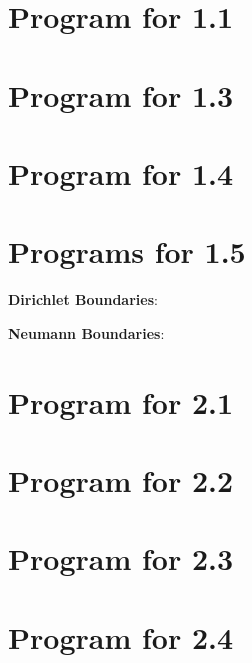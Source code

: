 \documentclass[10pt]{article}
\begin{document}
\newpage
\begin{appendix}
\section{Program for 1.1}
\label{a:1.1}

\newpage
\section{Program for 1.3}
\label{a:1.3}

\newpage
\section{Program for 1.4}
\label{a:1.4}

\newpage
\section{Programs for 1.5}
\label{a:1.5}
{\bf Dirichlet Boundaries}:

{\bf Neumann Boundaries}:

\newpage
\section{Program for 2.1}
\label{a:2.1}

\newpage
\section{Program for 2.2}
\label{a:2.2}

\newpage
\section{Program for 2.3}
\label{a:2.3}

\newpage
\section{Program for 2.4}
\label{a:2.4}

\end{appendix}
\end{document}

